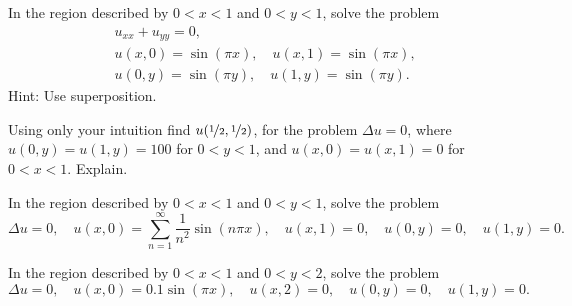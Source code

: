 \begin{exercise}
In the region described by $0 < x < 1$ and $0 < y < 1$,
solve the problem
\begin{align*}
& u_{xx} + u_{yy} = 0, \\
& u(x,0) = \sin (\pi x), \quad u(x,1) = \sin (\pi x), \\
& u(0,y) = \sin (\pi y), \quad u(1,y) = \sin (\pi y) .
\end{align*}
Hint: Use superposition.
\end{exercise}

\begin{exercise}[challenging]
Using only your intuition find $u(\nicefrac{1}{2},\nicefrac{1}{2})$,
for the problem
$\Delta u = 0$, where $u(0,y) = u(1,y) = 100$ for $0 < y < 1$, and
$u(x,0) = u(x,1) = 0$ for $0 < x < 1$.  Explain.
\end{exercise}

\setcounter{exercise}{100}

\begin{exercise}
In the region described by $0 < x < 1$ and $0 < y < 1$,
solve the problem
\begin{equation*}
\Delta u = 0, \quad u(x,0) = \sum_{n=1}^\infty \frac{1}{n^2} \sin (n \pi x),
\quad u(x,1) = 0,
\quad u(0,y) = 0, 
\quad u(1,y) = 0 .
\end{equation*}
\end{exercise}

\begin{exercise}
In the region described by $0 < x < 1$ and $0 < y < 2$,
solve the problem
\begin{equation*}
\Delta u = 0, \quad u(x,0) = 0.1 \sin (\pi x),
\quad u(x,2) = 0,
\quad u(0,y) = 0, 
\quad u(1,y) = 0 .
\end{equation*}
\end{exercise}

%

